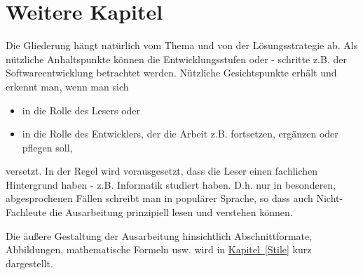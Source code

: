\chapter{Weitere Kapitel}

Die Gliederung hängt natürlich vom Thema und von der Lösungsstrategie ab. Als nützliche
Anhaltspunkte können die Entwicklungsstufen oder - schritte z.B. der Softwareentwicklung betrachtet werden. Nützliche Gesichtspunkte erhält und erkennt man, wenn man sich
\begin{itemize}
  \item in die Rolle des Lesers oder
  \item in die Rolle des Entwicklers, der die Arbeit z.B. fortsetzen, ergänzen oder pflegen soll,
\end{itemize}
versetzt. In der Regel wird vorausgesetzt, dass die Leser einen fachlichen Hintergrund haben - z.B. Informatik studiert haben. D.h. nur in besonderen, abgesprochenen Fällen schreibt man in populärer Sprache, so dass auch Nicht-Fachleute die Ausarbeitung prinzipiell lesen und verstehen können.

Die äußere Gestaltung der Ausarbeitung hinsichtlich Abschnittformate, Abbildungen, mathematische Formeln usw. wird in \hyperref[Stile]{Kapitel~\ref*{Stile}} kurz dargestellt.

